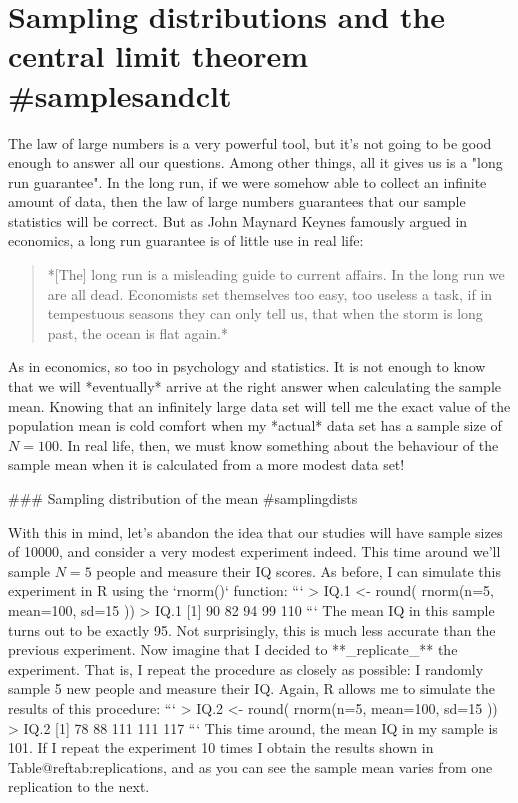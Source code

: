 \section{Sampling distributions and the central limit theorem {#samplesandclt}}

The law of large numbers is a very powerful tool, but it's not going to be good enough to answer all our questions. Among other things, all it gives us is a "long run guarantee". In the long run, if we were somehow able to collect an infinite amount of data, then the law of large numbers guarantees that our sample statistics will be correct. But as John Maynard Keynes famously argued in economics, a long run guarantee is of little use in real life:
\begin{quote}
*[The] long run is a misleading guide to current affairs. In the long run we are all dead. Economists set themselves too easy, too useless a task, if in tempestuous seasons they can only tell us, that when the storm is long past, the ocean is flat again.* \cite[p.~80]{Keynes1923}
\end{quote}
As in economics, so too in psychology and statistics. It is not enough to know that we will *eventually* arrive at the right answer when calculating the sample mean. Knowing that an infinitely large data set will tell me the exact value of the population mean is cold comfort when my *actual* data set has a sample size of $N=100$. In real life, then, we must know something about the behaviour of the sample mean when it is calculated from a more modest data set!

### Sampling distribution of the mean {#samplingdists}


With this in mind, let's abandon the idea that our studies will have sample sizes of 10000, and consider a very modest experiment indeed. This time around we'll sample $N=5$ people and measure their IQ scores. As before, I can simulate this experiment in R using the `rnorm()` function:
```
> IQ.1 <- round( rnorm(n=5, mean=100, sd=15 ))
> IQ.1
[1]  90  82  94  99 110
```
The mean IQ in this sample turns out to be exactly 95. Not surprisingly, this is much less accurate than the previous experiment. Now imagine that I decided to **_replicate_** the experiment. That is, I repeat the procedure as closely as possible: I randomly sample 5 new people and measure their IQ. Again, R allows me to simulate the results of this procedure:
```
> IQ.2 <- round( rnorm(n=5, mean=100, sd=15 ))
> IQ.2
[1]  78  88 111 111 117
```
This time around, the mean IQ in my sample is 101. If I repeat the experiment 10 times I obtain the results shown in Table@reftab:replications, and as you can see the sample mean varies from one replication to the next. 


